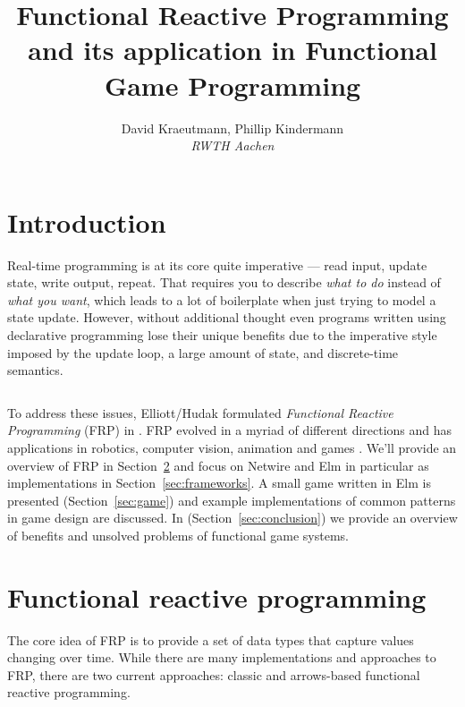 \documentclass[pdftex,a4paper]{extarticle}
\title{Functional Reactive Programming and its application in Functional Game Programming}
\author{{\large David Kraeutmann, Phillip Kindermann} \\
{\em RWTH Aachen}}
\begin{document}
\maketitle

\section{Introduction}
Real-time programming is at its core quite imperative --- read input, update state, write output, repeat. 
That requires you to describe \emph{what to do} instead of \emph{what you want}, which leads to a lot of boilerplate when just trying to model a state update.
However, without additional thought even programs written using declarative programming lose their unique benefits due to the imperative style imposed by the update loop, a large amount of state, and discrete-time semantics. 
\begin{listing}[ht]
\inputminted[breaklines=true]{haskell}{Loop.hs}
\label{lst:imperative}
\end{listing}

To address these issues, Elliott/Hudak formulated \emph{Functional Reactive Programming} (FRP) in \cite{ElliottHudak97:Fran}. FRP evolved in a myriad of different directions and has  applications in robotics, computer vision, animation and games \cite{haskell-wiki-yampa}. 
We'll provide an overview of FRP in Section~\ref{sec:frp}
and focus on Netwire and Elm in particular as implementations in Section~\ref{sec:frameworks}.
A small game written in Elm is presented (Section~\ref{sec:game}) and example implementations of common patterns in game design are discussed.
In (Section~\ref{sec:conclusion}) we provide an overview of benefits and unsolved problems of functional game systems.


\section{Functional reactive programming}
\label{sec:frp}
The core idea of FRP is to provide a set of data types that capture values changing over time. While there are many implementations and approaches to FRP, there are two current approaches: classic and arrows-based functional reactive programming. 
\end{document}
